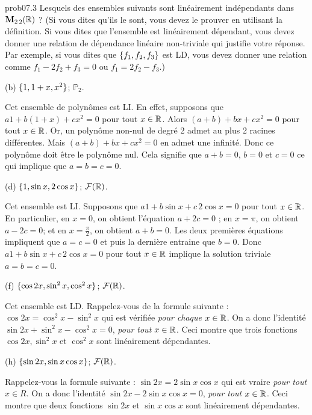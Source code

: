 \bigskip\begin{sol}{prob07.3}  Lesquels des ensembles suivants sont linéairement indépendants dans $\mathbf{M}_{2 \,2}(\mathbb{R})$ ? (Si vous dites qu'ils le sont, vous devez le prouver en utilisant la définition. Si vous dites que l'ensemble est linéairement dépendant, vous devez donner une relation de dépendance linéaire non-triviale qui justifie votre réponse. Par exemple, si vous dites que $\{f_1, f_2, f_3\}$ est LD, vous devez donner une relation comme  $f_1-2 f_2 +f_3=0$ ou $f_1=2 f_2 -f_3$.)
\medskip

(b)  $\{1, 1+x, x^2\}$;  $\mathbb P_2$. 

\soln Cet ensemble de polynômes est LI. En effet, supposons que $a 1 + b(1+x)+ cx^2=0$ pour tout $x\in \mathbb{R}$. Alors $(a+b) +bx +cx^2=0$ pour tout $x\in \mathbb{R}$. Or, un polynôme non-nul de degré 2 admet au plus 2 racines différentes. Mais $(a+b) +bx +cx^2=0$ en admet une infinité. Donc ce polynôme doit être le polynôme nul. Cela signifie que $a+b=0$, $b=0$ et $c=0$ ce qui implique que $a=b=c=0$. \medskip 
 

(d)  $\{1, \sin x, 2 \cos x\}$;  $\mathcal{F}(\mathbb{R})$.

\soln Cet ensemble est LI.  Supposons que $a1 + b\sin x +c\, 2 \cos x=0$ pour tout $x\in \mathbb{R}$. En particulier, en $x=0$, on obtient l'équation $a+ 2c=0$ ; en $x=\pi$, on obtient $a- 2c=0$; et en $x=\frac{\pi}2$, on obtient $a+b=0$. Les deux premières équations impliquent que $a=c=0$ et puis la dernière entraine que $b=0$. Donc $a1 + b\sin x +c\, 2 \cos x=0$ pour tout $x\in \mathbb{R}$ implique la solution triviale $a=b=c=0$.
 \medskip  

(f)  $\{\cos 2x, \sin^2 x,  \cos^2 x\}$;  $\mathcal{F}(\mathbb{R})$.

\soln Cet ensemble est LD. Rappelez-vous de la formule suivante : $\cos 2x= \cos^2x -\sin^2 x$ qui est vérifiée {\it pour chaque $x\in \mathbb{R}$}. On a donc l'identité $\sin 2x + \sin^2 x -\cos^2 x=0$, {\it pour tout $x\in \mathbb{R}$}. Ceci montre que trois fonctions $\cos 2x, \sin^2 x$ et $\cos^2 x$ sont linéairement dépendantes.

 \medskip  

(h)  $\{\sin 2x, \sin x \cos x \}$;  $\mathcal{F}(\mathbb{R})$. 

\soln Rappelez-vous la formule suivante : $\sin 2x= 2\sin x \cos x$ qui est vraire {\it pour tout $x\in R$}. On a donc l'identité $\sin 2x -2 \sin x \cos x=0$, {\it pour tout $x\in \mathbb{R}$}. Ceci montre que deux fonctions $\sin 2x$ et $ \sin x \cos x$ sont linéairement dépendantes.
\medskip


\end{sol}

